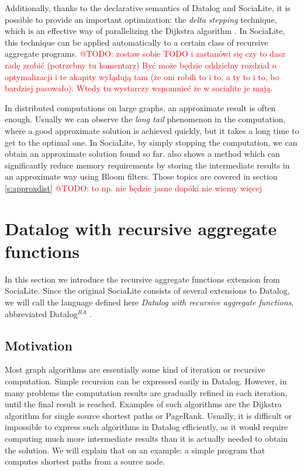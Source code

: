 \documentclass{pracamgr}
\makeatletter
\theoremstyle{plain}
\theoremstyle{definition}
\theoremstyle{remark}
\newcommand{\todo}[1]{\textcolor{red}{@TODO: #1}}
\newcommand{\datalogra}{Datalog$^{RA}$ }
\makeatother
\begin{document}
Additionally, thanks to the declarative semantics of Datalog and SociaLite, it is possible to provide an important optimization: the \emph{delta stepping} technique, which is an effective way of parallelizing the Dijkstra algorithm \cite{deltastep}. In SociaLite, this technique can be applied automatically to a certain class of recursive aggregate programs. \todo{zostaw sobie TODO i zastanówi się czy to dasz radę zrobić (potrzebny tu komentarz)
Być może będzie oddzielny rozdział o optymalizacji i te akapity wylądują tam (że oni robili to i to, a ty to i to, bo bardziej pasowało). Wtedy tu wystarczy wspomnieć że w socialite je mają.}

In distributed computations on large graphs, an approximate result is often enough. Usually we can observe the \emph{long tail} phenomenon in the computation, where a good approximate solution is achieved quickly, but it takes a long time to get to the optimal one. In SociaLite, by simply stopping the computation, we can obtain an approximate solution found so far. \cite{distsoc} also shows a method which can significantly reduce memory requirements by storing the intermediate results in an approximate way using Bloom filters. Those topics are covered in section \ref{s:approxdist} \todo{to np. nie będzie jasne dopóki nie wiemy więcej}

\section{Datalog with recursive aggregate functions}\label{s:recaggr}

In this section we introduce the recursive aggregate functions extension from SociaLite. Since the original SociaLite consists of several extensions to Datalog, we will call the language defined here \emph{Datalog with recursive aggregate functions}, abbreviated \datalogra.

\subsection{Motivation}
Most graph algorithms are essentially some kind of iteration or recursive computation. Simple recursion can be expressed easily in Datalog. However, in many problems the computation results are gradually refined in each iteration, until the final result is reached. Examples of such algorithms are the Dijkstra algorithm for single source shortest paths or PageRank. Usually, it is difficult or impossible to express such algorithms in Datalog efficiently, as it would require computing much more intermediate results than it is actually needed to obtain the solution. We will explain that on an example: a simple program that computes shortest paths from a source node.
\end{document}
